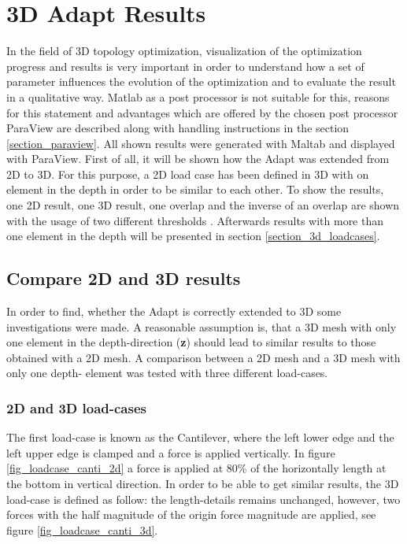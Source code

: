 
\chapter{3D Adapt Results}
In the field of 3D topology optimization,
visualization of the optimization progress and results is very important
in order to understand how a set of parameter influences
the evolution of the optimization and to evaluate the result in a qualitative way. Matlab as a post processor is not suitable for this, reasons for this
statement and advantages which are offered by the chosen post processor ParaView are described along with handling instructions in the section
 \ref{section_paraview}. 
All shown results were generated with Maltab and displayed with ParaView. 
First of all, it will be shown how the Adapt
was extended from 2D to 3D. For this purpose, a 2D load case has been
defined in 3D with on element in the depth in order to be
similar to each other. To show the results,
 one 2D result, one 3D result, one overlap
 and the inverse of an overlap are shown with 
 the usage of two different thresholds . Afterwards results with more than
 one element in the depth will be presented in section
  \ref{section_3d_loadcases}.

\section{Compare 2D and 3D results }
In order to find, whether the Adapt is correctly extended to 3D some investigations were made. A reasonable assumption is, that a 3D mesh with only one element in the depth-direction (\textbf{z}) should lead
to similar results to those obtained with
a 2D mesh.
A comparison between a 2D mesh and a
 3D mesh with only one depth- element was tested 
 with three different load-cases.

\subsection{2D and 3D load-cases}

The first load-case is known as the Cantilever,
where the left
 lower edge and the left upper edge is clamped and a force is applied vertically. In figure \ref{fig_loadcase_canti_2d} a force is applied at 80\% of the horizontally length at the bottom in vertical direction. In order to be able to get similar results, the 3D load-case is defined as follow:
 the length-details remains unchanged, however, two forces with the half magnitude of the origin force magnitude are applied, see figure \ref{fig_loadcase_canti_3d}.

